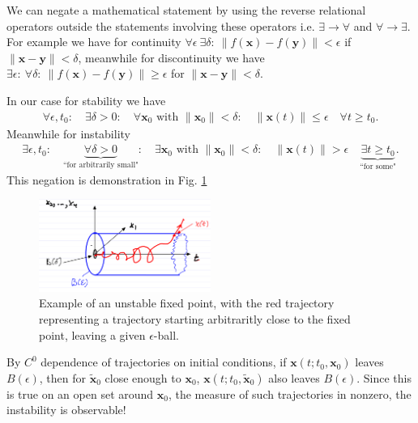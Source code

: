 \begin{remark}[]
	We can negate a mathematical statement by using the reverse relational operators outside the statements involving these operators i.e. $ \exists \to \forall $ and $\forall \to \exists $. For example we have for continuity $\forall \epsilon\ \exists \delta:\  \|f( \bm{x}) - f( \bm{y}) \| < \epsilon$ if $ \| \bm{x}- \bm{y} \|<\delta$, meanwhile for discontinuity we have  $\exists \epsilon:\ \forall \delta:\  \|f( \bm{x}) - f( \bm{y}) \| \geq  \epsilon$ for $ \| \bm{x}- \bm{y} \|< \delta$.

	In our case for stability we have
	\begin{align}
		\forall \epsilon,t_0: \quad \exists \delta>0: \quad \forall  \bm{x}_0  \textrm{ with }  \| \bm{x}_0 \| < \delta: \quad  \| \bm{x}(t) \|\leq \epsilon \quad \forall t\geq t_0.
	\end{align}
Meanwhile for instability 
\begin{align}
	\exists \epsilon,t_0:\quad \underbrace{\forall \delta>0}_{ \textrm{``for arbitrarily small"} }:\quad \exists  \bm{x}_0  \textrm{ with }  \| \bm{x}_0 \|<\delta: \quad  \| \bm{x}(t) \|>\epsilon \quad \underbrace{\exists t\geq t_0}_{ \textrm{``for some"} }.
\end{align}
This negation is demonstration in Fig. \ref{fig:instable_def}
\begin{figure}[h!]
	\centering
	\includegraphics[width=0.5\textwidth]{figures/ch2/6unstable_def.png}
	\caption{Example of an unstable fixed point, with the red trajectory representing a trajectory starting arbitraritly close to the fixed point, leaving a given $\epsilon$-ball.}
	\label{fig:instable_def}
\end{figure}
\end{remark}

\begin{remark}[]
	By $C^0$ dependence of trajectories on initial conditions, if $ \bm{x}(t;t_0, \bm{x}_0)$ leaves $B(\epsilon)$, then for $\tilde{ \bm{x}}_0$ close enough to $ \bm{x}_0$, $ \bm{x}(t;t_0,\tilde{ \bm{x}}_0)$ also leaves $B(\epsilon)$. Since this is true on an open set around $\bm{x}_0$, the measure of such trajectories in nonzero, the instability is observable!
\end{remark}

